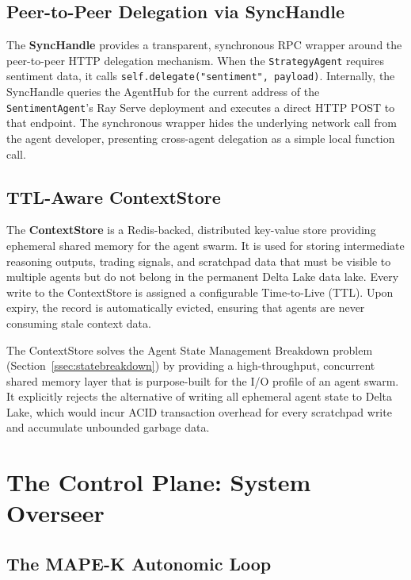 \documentclass[12pt, a4paper]{report}
\begin{document}
\subsection{Peer-to-Peer Delegation via SyncHandle}
\label{ssec:synchandle}

The \textbf{SyncHandle} provides a transparent, synchronous RPC wrapper around the
peer-to-peer HTTP delegation mechanism.
When the \texttt{StrategyAgent} requires sentiment data, it calls
\texttt{self.delegate("sentiment", payload)}.
Internally, the SyncHandle queries the AgentHub for the current address of the
\texttt{SentimentAgent}'s Ray Serve deployment and executes a direct HTTP POST to that
endpoint.
The synchronous wrapper hides the underlying network call from the agent developer,
presenting cross-agent delegation as a simple local function call.

\subsection{TTL-Aware ContextStore}
\label{ssec:contextstore}

The \textbf{ContextStore} is a Redis-backed, distributed key-value store providing
ephemeral shared memory for the agent swarm.
It is used for storing intermediate reasoning outputs, trading signals, and scratchpad
data that must be visible to multiple agents but do not belong in the permanent Delta
Lake data lake.
Every write to the ContextStore is assigned a configurable Time-to-Live (TTL).
Upon expiry, the record is automatically evicted, ensuring that agents are never
consuming stale context data.

The ContextStore solves the Agent State Management Breakdown problem
(Section~\ref{ssec:statebreakdown}) by providing a high-throughput, concurrent shared
memory layer that is purpose-built for the I/O profile of an agent swarm.
It explicitly rejects the alternative of writing all ephemeral agent state to Delta Lake,
which would incur ACID transaction overhead for every scratchpad write and accumulate
unbounded garbage data.

\section{The Control Plane: System Overseer}
\label{sec:control_plane}

\subsection{The MAPE-K Autonomic Loop}
\label{ssec:mapek_impl}
\end{document}

